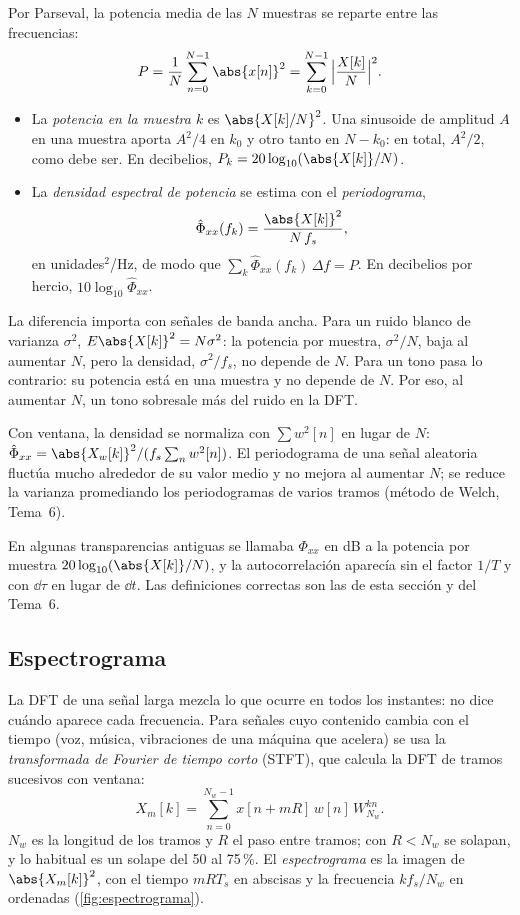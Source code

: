 \documentclass[11pt,a4paper]{scrartcl}
\begin{document}
Por Parseval, la potencia media de las $N$ muestras se reparte entre las frecuencias:
\[
  P=\frac1N\sum_{n=0}^{N-1}\abs{x[n]}^2=\sum_{k=0}^{N-1}\Big|\frac{X[k]}N\Big|^2.
\]
\begin{itemize}
  \item La \emph{potencia en la muestra $k$} es $\abs{X[k]/N}^2$. Una sinusoide de amplitud $A$ en una muestra aporta $A^2/4$ en $k_0$ y otro tanto en $N-k_0$: en total, $A^2/2$, como debe ser. En decibelios, $P_k=20\log_{10}(\abs{X[k]}/N)$.
  \item La \emph{densidad espectral de potencia} se estima con el \emph{periodograma},
  \[
    \hat\Phi_{xx}(f_k)=\frac{\abs{X[k]}^2}{N\,f_s},
  \]
  en unidades$^2$/Hz, de modo que $\sum_k\hat\Phi_{xx}(f_k)\,\Delta f=P$. En decibelios por hercio, $10\log_{10}\hat\Phi_{xx}$.
\end{itemize}
La diferencia importa con señales de banda ancha. Para un ruido blanco de varianza $\sigma^2$, $E\abs{X[k]}^2=N\sigma^2$: la potencia por muestra, $\sigma^2/N$, baja al aumentar $N$, pero la densidad, $\sigma^2/f_s$, no depende de $N$. Para un tono pasa lo contrario: su potencia está en una muestra y no depende de $N$. Por eso, al aumentar $N$, un tono sobresale más del ruido en la DFT.

Con ventana, la densidad se normaliza con $\sum w^2[n]$ en lugar de $N$: $\hat\Phi_{xx}=\abs{X_w[k]}^2/(f_s\sum_nw^2[n])$. El periodograma de una señal aleatoria fluctúa mucho alrededor de su valor medio y no mejora al aumentar $N$; se reduce la varianza promediando los periodogramas de varios tramos (método de Welch, Tema~6).

\begin{errata}
  En algunas transparencias antiguas se llamaba $\Phi_{xx}$ en dB a la potencia por muestra $20\log_{10}(\abs{X[k]}/N)$, y la autocorrelación aparecía sin el factor $1/T$ y con $\dd\tau$ en lugar de $\dd t$. Las definiciones correctas son las de esta sección y del Tema~6.
\end{errata}

\subsection{Espectrograma}

La DFT de una señal larga mezcla lo que ocurre en todos los instantes: no dice cuándo aparece cada frecuencia. Para señales cuyo contenido cambia con el tiempo (voz, música, vibraciones de una máquina que acelera) se usa la \emph{transformada de Fourier de tiempo corto} (STFT), que calcula la DFT de tramos sucesivos con ventana:
\[
  X_m[k]=\sum_{n=0}^{N_w-1}x[n+mR]\,w[n]\,W_{N_w}^{kn}.
\]
$N_w$ es la longitud de los tramos y $R$ el paso entre tramos; con $R<N_w$ se solapan, y lo habitual es un solape del 50 al 75\,\%. El \emph{espectrograma} es la imagen de $\abs{X_m[k]}^2$, con el tiempo $mRT_s$ en abscisas y la frecuencia $kf_s/N_w$ en ordenadas (\cref{fig:espectrograma}).
\end{document}
